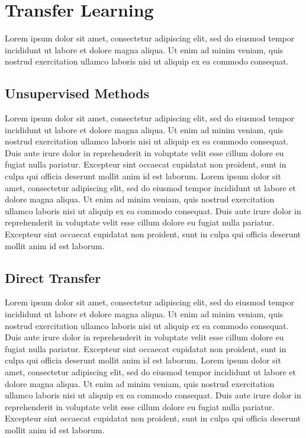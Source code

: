 \documentclass[12pt]{article}
\begin{document}
\section{Transfer Learning}
Lorem ipsum dolor sit amet, consectetur adipiscing elit, sed do eiusmod tempor incididunt ut labore et dolore magna aliqua. Ut enim ad minim veniam, quis nostrud exercitation ullamco laboris nisi ut aliquip ex ea commodo consequat.

\subsection{Unsupervised Methods}
Lorem ipsum dolor sit amet, consectetur adipiscing elit, sed do eiusmod tempor incididunt ut labore et dolore magna aliqua. Ut enim ad minim veniam, quis nostrud exercitation ullamco laboris nisi ut aliquip ex ea commodo consequat. Duis aute irure dolor in reprehenderit in voluptate velit esse cillum dolore eu fugiat nulla pariatur. Excepteur sint occaecat cupidatat non proident, sunt in culpa qui officia deserunt mollit anim id est laborum. Lorem ipsum dolor sit amet, consectetur adipiscing elit, sed do eiusmod tempor incididunt ut labore et dolore magna aliqua. Ut enim ad minim veniam, quis nostrud exercitation ullamco laboris nisi ut aliquip ex ea commodo consequat. Duis aute irure dolor in reprehenderit in voluptate velit esse cillum dolore eu fugiat nulla pariatur. Excepteur sint occaecat cupidatat non proident, sunt in culpa qui officia deserunt mollit anim id est laborum.

\subsection{Direct Transfer}
Lorem ipsum dolor sit amet, consectetur adipiscing elit, sed do eiusmod tempor incididunt ut labore et dolore magna aliqua. Ut enim ad minim veniam, quis nostrud exercitation ullamco laboris nisi ut aliquip ex ea commodo consequat. Duis aute irure dolor in reprehenderit in voluptate velit esse cillum dolore eu fugiat nulla pariatur. Excepteur sint occaecat cupidatat non proident, sunt in culpa qui officia deserunt mollit anim id est laborum. Lorem ipsum dolor sit amet, consectetur adipiscing elit, sed do eiusmod tempor incididunt ut labore et dolore magna aliqua. Ut enim ad minim veniam, quis nostrud exercitation ullamco laboris nisi ut aliquip ex ea commodo consequat. Duis aute irure dolor in reprehenderit in voluptate velit esse cillum dolore eu fugiat nulla pariatur. Excepteur sint occaecat cupidatat non proident, sunt in culpa qui officia deserunt mollit anim id est laborum.
\end{document}
